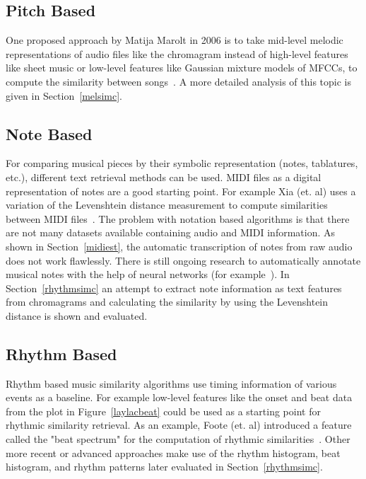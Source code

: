 \subsection{Pitch Based}

One proposed approach by Matija Marolt in 2006 is to take mid-level melodic representations of audio files like the chromagram instead of high-level features like sheet music or low-level features like Gaussian mixture models of MFCCs, to compute the similarity between songs~\cite{pitch1}. A more detailed analysis of this topic is given in Section~\ref{melsimc}.

\subsection{Note Based}

For comparing musical pieces by their symbolic representation (notes, tablatures, etc.), different text retrieval methods can be used. MIDI files as a digital representation of notes are a good starting point. For example Xia (et. al) uses a variation of the Levenshtein distance measurement to compute similarities between MIDI files~\cite{chroma4}. 
The problem with notation based algorithms is that there are not many datasets available containing audio and MIDI information. As shown in Section~\ref{midiest}, the automatic transcription of notes from raw audio does not work flawlessly. There is still ongoing research to automatically annotate musical notes with the help of neural networks (for example~\cite{crepe1}).
In Section~\ref{rhythmsimc} an attempt to extract note information as text features from chromagrams and calculating the similarity by using the Levenshtein distance is shown and evaluated.

\subsection{Rhythm Based}

Rhythm based music similarity algorithms use timing information of various events as a baseline. For example low-level features like the onset and beat data from the plot in Figure~\ref{laylacbeat} could be used as a starting point for rhythmic similarity retrieval. As an example, Foote (et. al) introduced a feature called the "beat spectrum" for the computation of rhythmic similarities~\cite{rhythm1}. Other more recent or advanced approaches make use of the rhythm histogram, beat histogram, and rhythm patterns later evaluated in Section~\ref{rhythmsimc}.

